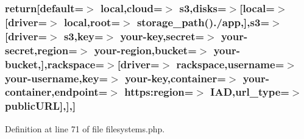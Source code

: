 \subsubsection[{return}]{\setlength{\rightskip}{0pt plus 5cm}return[\textquotesingle{}default\textquotesingle{}=$>$ \textquotesingle{}local\textquotesingle{},\textquotesingle{}cloud\textquotesingle{}=$>$ \textquotesingle{}s3\textquotesingle{},\textquotesingle{}disks\textquotesingle{}=$>$[\textquotesingle{}local\textquotesingle{}=$>$[\textquotesingle{}driver\textquotesingle{}=$>$ \textquotesingle{}local\textquotesingle{},\textquotesingle{}root\textquotesingle{}=$>$ storage\+\_\+path().\textquotesingle{}/app\textquotesingle{},],\textquotesingle{}s3\textquotesingle{}=$>$[\textquotesingle{}driver\textquotesingle{}=$>$ \textquotesingle{}s3\textquotesingle{},\textquotesingle{}key\textquotesingle{}=$>$ \textquotesingle{}your-\/key\textquotesingle{},\textquotesingle{}secret\textquotesingle{}=$>$ \textquotesingle{}your-\/secret\textquotesingle{},\textquotesingle{}region\textquotesingle{}=$>$ \textquotesingle{}your-\/region\textquotesingle{},\textquotesingle{}bucket\textquotesingle{}=$>$ \textquotesingle{}your-\/bucket\textquotesingle{},],\textquotesingle{}rackspace\textquotesingle{}=$>$[\textquotesingle{}driver\textquotesingle{}=$>$ \textquotesingle{}rackspace\textquotesingle{},\textquotesingle{}username\textquotesingle{}=$>$ \textquotesingle{}your-\/username\textquotesingle{},\textquotesingle{}key\textquotesingle{}=$>$ \textquotesingle{}your-\/key\textquotesingle{},\textquotesingle{}container\textquotesingle{}=$>$ \textquotesingle{}your-\/container\textquotesingle{},\textquotesingle{}endpoint\textquotesingle{}=$>$ \textquotesingle{}https\+:\textquotesingle{}region\textquotesingle{}=$>$ \textquotesingle{}I\+A\+D\textquotesingle{},\textquotesingle{}url\+\_\+type\textquotesingle{}=$>$ \textquotesingle{}public\+U\+R\+L\textquotesingle{}],],]}\label{filesystems_8php_a1eb32cd02079691c082fb8e4678d7650}


Definition at line 71 of file filesystems.\+php.

